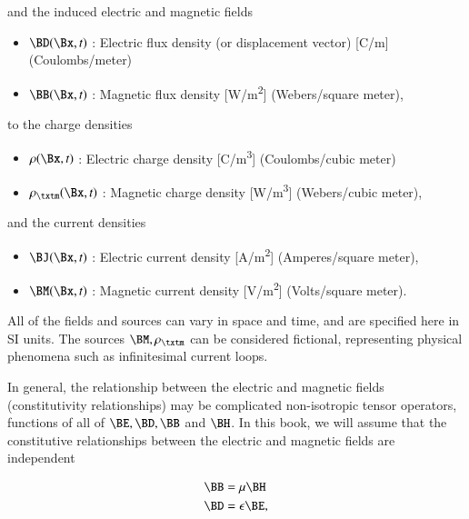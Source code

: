 and the induced electric and magnetic fields

\begin{itemize}
	\item \( \BD(\Bx, t) \) : Electric flux density (or displacement vector) [\si{C/m}] (Coulombs/meter)
	\item \( \BB(\Bx, t) \) : Magnetic flux density [\si{W/m^2}] (Webers/square meter),
\end{itemize}

to the charge densities

\begin{itemize}
	\item \( \rho(\Bx, t) \) : Electric charge density [\si{C/m^3}] (Coulombs/cubic meter)
   \item \( \rho_\txtm(\Bx, t) \) : Magnetic charge density [\si{W/m^3}] (Webers/cubic meter),
\end{itemize}

and the current densities

\begin{itemize}
	\item \( \BJ(\Bx, t) \) : Electric current density [\si{A/m^2}] (Amperes/square meter),
   \item \( \BM(\Bx, t) \) : Magnetic current density [\si{V/m^2}] (Volts/square meter).
\end{itemize}

All of the fields and sources can vary in space and time, and are specified here in SI units.
The sources \( \BM, \rho_\txtm \) can be considered fictional, representing physical phenomena such as infinitesimal current loops.

In general, the relationship between the electric and magnetic fields (constitutivity relationships) may be complicated
non-isotropic tensor operators, functions of all of \( \BE, \BD, \BB \) and \( \BH \).
In this book, we will assume that the constitutive relationships between the electric and magnetic fields are independent

\index{\(\mu\)}
\index{\(\epsilon\)}
\begin{dmath}\label{eqn:freespace:300}
\begin{aligned}
\BB &= \mu \BH \\
\BD &= \epsilon \BE,
\end{aligned}
\end{dmath}

